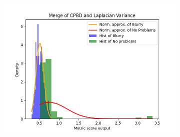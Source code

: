 \begin{figure}[H]
\begin{subfigure}[t]{0.48\textwidth}
        \caption{}
        \label{fig:CPBD_LV_thresh}
    \end{subfigure}\hspace{1em}
    \begin{subfigure}[t]{0.48\textwidth}
        \includegraphics[width=\textwidth]{Figures/BlurredImages/results_on_thresholds/output_dens_cpbd_lv.png}
        \caption{}
        \label{fig:CPBD_LV_dens}
    \end{subfigure}\hspace{1em}
    \caption{}
    \label{fig:CPBD_LV_final}
\end{figure}

